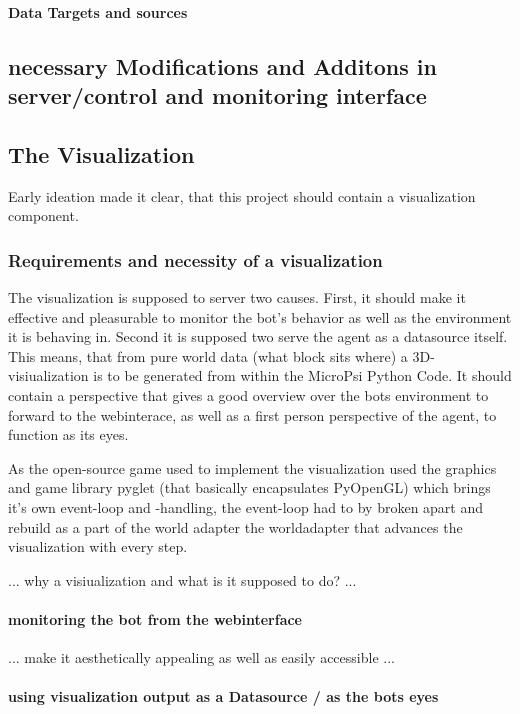 \paragraph{Data Targets and sources}

\subsection{necessary Modifications and Additons in server/control and monitoring interface}

\subsection{The Visualization}
Early ideation made it clear, that this project should contain a visualization component. 

\subsubsection{Requirements and necessity of a visualization}
The visualization is supposed to server two causes. First, it should make it effective and pleasurable to monitor the bot's behavior as well as the environment it is behaving in. Second it is supposed two serve the agent as a datasource itself. This means, that from pure world data (what block sits where) a 3D-visiualization is to be generated from within the MicroPsi Python Code. It should contain a perspective that gives a good overview over the bots environment to forward to the webinterace, as well as a first person perspective of the agent, to function as its eyes.

As the open-source game used to implement the visualization used the graphics and game library pyglet (that basically encapsulates PyOpenGL) which brings it's own event-loop and -handling, the event-loop had to by broken apart and rebuild as a part of the world adapter the worldadapter that advances the visualization with every step.


... why a visiualization and what is it supposed to do? ...

\paragraph{monitoring the bot from the webinterface}
... make it aesthetically appealing as well as easily accessible ...

\paragraph{using visualization output as a Datasource / as the bots eyes}

